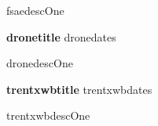 \documentclass[10pt,a4paper]{article}
\newcommand{\projectTwo}{fsae}
\newcommand{\projectThree}{drone}
\newcommand{\projectFour}{trentxwb}
\newcommand{\get}[2]{\csname #1#2\endcsname}
\begin{document}
\get{\projectTwo}{descOne}

\vspace{4pt}

\textbf{\get{\projectThree}{title}} \hfill \get{\projectThree}{dates}

\get{\projectThree}{descOne}

\vspace{4pt}

\textbf{\get{\projectFour}{title}} \hfill \get{\projectFour}{dates}

\get{\projectFour}{descOne}

\vspace{2pt}

\hrulefill 


\skills

%
\end{document}
